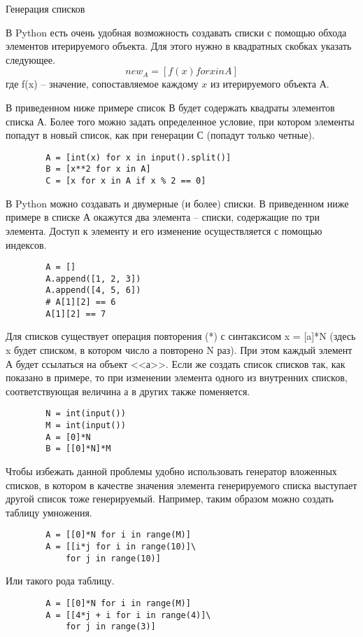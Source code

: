 \documentclass[a4paper, fleqn]{article}
\begin{document}
	Генерация списков
	
	В Python есть очень удобная возможность создавать списки с помощью обхода элементов итерируемого объекта. Для этого нужно в квадратных скобках указать следующее.
	\[new_A = [f(x) for x in A]\]
	где f(x)  -- значение, сопоставляемое каждому $x$ из итерируемого объекта А.
	
	В приведенном ниже примере список В будет содержать квадраты элементов списка А. Более того можно задать определенное условие, при котором элементы попадут в новый список, как при генерации С (попадут только четные).
	
	\begin{lstlisting}
		A = [int(x) for x in input().split()]
		B = [x**2 for x in A]
		C = [x for x in A if x % 2 == 0]
	\end{lstlisting}
	
	В Python можно создавать и двумерные (и более) списки. В приведенном ниже примере в списке А окажутся два элемента -- списки, содержащие по три элемента. Доступ  к элементу и его изменение осуществляется с помощью индексов.
	
	\begin{lstlisting}
		A = []
		A.append([1, 2, 3])
		A.append([4, 5, 6])
		# A[1][2] == 6
		A[1][2] == 7
	\end{lstlisting}
	Для списков существует операция повторения (*) с синтаксисом x = [a]*N (здесь x будет списком, в котором число а повторено N раз). При этом каждый элемент А будет ссылаться на объект <<а>>. Если же создать список списков так, как показано в примере, то при изменении элемента одного из внутренних списков, соответствующая величина а в других также поменяется.
	\begin{lstlisting}
		N = int(input())
		M = int(input())
		A = [0]*N
		B = [[0]*N]*M
	\end{lstlisting}
	
	Чтобы избежать данной проблемы удобно использовать генератор вложенных списков, в котором в качестве значения элемента генерируемого списка выступает другой список тоже генерируемый. Например, таким образом можно создать таблицу умножения.
	\begin{lstlisting}
		A = [[0]*N for i in range(M)]
		A = [[i*j for i in range(10)]\
			for j in range(10)]
	\end{lstlisting}
	
	Или такого рода таблицу.
	\begin{lstlisting}
		A = [[0]*N for i in range(M)]
		A = [[4*j + i for i in range(4)]\
			for j in range(3)]
	\end{lstlisting}
	
\end{document}
